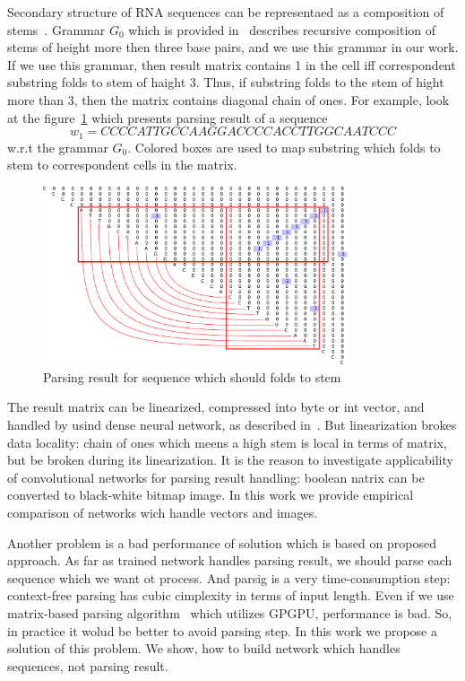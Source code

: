 \documentclass[12pt,a4paper]{cibb}
\begin{document}
Secondary structure of RNA sequences can be representaed as a composition of stems~\cite{MQbioinformatics19}.
Grammar $G_0$ which is provided in~\cite{grigorevcomposition} describes recursive composition of stems of height more then three base pairs, and we use this grammar in our work.
If we use this grammar, then result matrix contains 1 in the cell iff correspondent substring folds to stem of haight 3.
Thus, if substring folds to the stem of hight more than 3, then the matrix contains diagonal chain of ones.
For example, look at the figure~\ref{fig:example} which presents parsing result of a sequence
$$
w_1 = CCCCATTGCCAAGGACCCCACCTTGGCAATCCC
$$
w.r.t the grammar $G_0$.
Colored boxes are used to map substring which folds to stem to correspondent cells in the matrix.

\begin{figure}[h]
\begin{center}
\centering
\includegraphics[width=0.8\textwidth]{figures/4.pdf}
\caption{Parsing result for sequence which should folds to
stem}
\label{fig:example}
\end{center}
\end{figure}

The result matrix can be linearized, compressed into byte or int vector, and handled by usind dense neural network, as described in~\cite{grigorevcomposition}.
But linearization brokes data locality: chain of ones which meens a high stem is local in terms of matrix, but be broken during its linearization.
It is the reason to investigate applicability of convolutional networks for parsing result handling: boolean natrix can be converted to black-white bitmap image.
In this work we provide empirical comparison of networks wich handle vectors and images.

Another problem is a bad performance of solution which is based on proposed approach.
As far as trained network handles parsing result, we should parse each sequence which we want ot process.
And parsig is a very time-consumption step: context-free parsing has cubic cimplexity in terms of input length.
Even if we use matrix-based parsing algorithm~\cite{Azimov:2018:CPQ:3210259.3210264} which utilizes GPGPU, performance is bad.
So, in practice it wolud be better to avoid parsing step.
In this work we propose a solution of this problem.
We show, how to build network which handles sequences, not parsing result.
\end{document}
